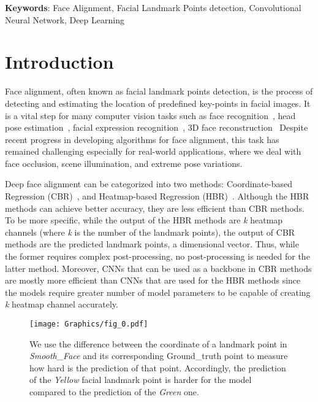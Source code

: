 \documentclass[a4paper,conference]{IEEEtran}
\begin{document}
\textbf{Keywords}: Face Alignment, Facial Landmark Points detection, Convolutional Neural Network, Deep Learning 

\IEEEpeerreviewmaketitle



\section{Introduction}\label{sec:intro}
Face alignment, often known as facial landmark points detection, is the process of detecting and estimating the location of predefined key-points in facial images. It is a vital step for many computer vision tasks such as face recognition~\cite{adcore9727163, soltanpour2017survey, juhong2017face, ozseven2017face}, head pose estimation~\cite{xia2019head, fard2021asmnet}, facial expression recognition~\cite{sun2014deep, choi2020facial, kalapala2020facial, liu2021facial}, 3D face reconstruction~\cite{liu2016joint, jiang20183d, afzal20203d} Despite recent progress in developing algorithms for face alignment, this task has remained challenging especially for real-world applications, where we deal with face occlusion, scene illumination, and extreme pose variations. 

Deep face alignment can be categorized into two methods: Coordinate-based Regression (CBR)~\cite{feng2018wing, zhang2019facial, sadiq2019facial, yan2020fine, zhang2020phased, fard2021asmnet}, and Heatmap-based Regression (HBR)~\cite{wu2018look, ning2020cpu, wang2019adaptive, liu2019attention, wu2021design}. Although the HBR methods can achieve better accuracy, they are less efficient than CBR methods. To be more specific, while the output of the HBR methods are \textit{k} heatmap channels (where \textit{k} is the number of the landmark points), the output of CBR methods are the predicted landmark points, a dimensional vector. Thus, while the former requires complex post-processing, no post-processing is needed for the latter method. Moreover, CNNs that can be used as a backbone in CBR methods are mostly more efficient than CNNs that are used for the HBR methods since the models require greater number of model parameters to be capable of creating \textit{k} heatmap channel accurately.

\begin{figure}[t!]
 \centering
 \texttt{[image: Graphics/fig\_0.pdf]}
 \caption{ We use the difference between the coordinate of a landmark point in \textit{Smooth\_Face} and its corresponding Ground\_truth point to measure how hard is the prediction of that point. Accordingly, the prediction of the \textit{Yellow} facial landmark point is harder for the model compared to the prediction of the \textit{Green} one.}
  \label{fig:main_idea}
\end{figure}
\end{document}
